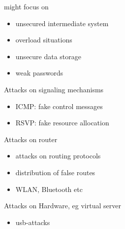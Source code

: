 \documentclass[11pt]{article}
\begin{document}
might focus on
\begin{itemize}
\item unsecured intermediate system
\item overload situations
\item unsecure data storage
\item weak passwords
\end{itemize}

Attacks on signaling mechanisms
\begin{itemize}
\item ICMP: fake control messages
\item RSVP: fake resource allocation
\end{itemize}

Attacks on router
\begin{itemize}
\item attacks on routing protocols
\item distribution of false routes
\item WLAN, Bluetooth etc
\end{itemize}

Attacks on Hardware, eg virtual server
\begin{itemize}
\item usb-attacks
\end{itemize}
\end{document}
